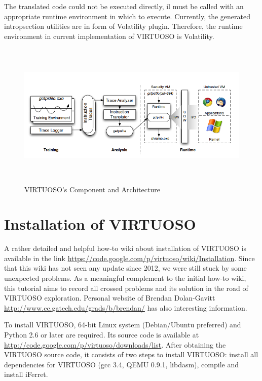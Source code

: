 The translated code could not be executed directly, il must be called with an appropriate runtime environment in which to execute. Currently, the
generated intropsection utilities are in form of Volatility plugin. Therefore, the runtime environment in current implementation of VIRTUOSO is 
Volatility.
  
\begin{figure}[htbp]
	\centering
		\includegraphics[width=14cm, height= 7cm ]{Figures/FigureVirtuoso.png}
	\caption{VIRTUOSO's Component and Architecture \cite{Reference27}}
	\label{fig:VIRTUOSO's Component and Architecture}
\end{figure}

\section{Installation of VIRTUOSO}

A rather detailed and helpful how-to wiki about installation of VIRTUOSO is available in the link 
\url{https://code.google.com/p/virtuoso/wiki/Installation}. Since that this wiki has not seen any update since 2012, 
we were still stuck by some unexpected problems.  As a meaningful complement to the initial how-to wiki, this tutorial aims to record 
all crossed problems and its solution in the road of VIRTUOSO exploration. Personal website of Brendan Dolan-Gavitt 
\url{http://www.cc.gatech.edu/grads/b/brendan/} has also interesting information.

To install VIRTUOSO, 64-bit Linux system (Debian/Ubuntu preferred) and Python 2.6 or later are required. Its source code is available at 
\url{http://code.google.com/p/virtuoso/downloads/list}. After obtaining the VIRTUOSO source code, it consists of two steps to install VIRTUOSO:
install all dependencies for VIRTUOSO (gcc 3.4, QEMU 0.9.1, libdasm), compile and install iFerret.

